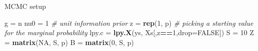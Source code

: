 \documentclass[ignorenonframetext,]{beamer}
\newenvironment{Shaded}{\begin{snugshade}}{\end{snugshade}}
\newcommand{\KeywordTok}[1]{\textcolor[rgb]{0.13,0.29,0.53}{\textbf{#1}}}
\newcommand{\DataTypeTok}[1]{\textcolor[rgb]{0.13,0.29,0.53}{#1}}
\newcommand{\DecValTok}[1]{\textcolor[rgb]{0.00,0.00,0.81}{#1}}
\newcommand{\StringTok}[1]{\textcolor[rgb]{0.31,0.60,0.02}{#1}}
\newcommand{\CommentTok}[1]{\textcolor[rgb]{0.56,0.35,0.01}{\textit{#1}}}
\newcommand{\OtherTok}[1]{\textcolor[rgb]{0.56,0.35,0.01}{#1}}
\newcommand{\OperatorTok}[1]{\textcolor[rgb]{0.81,0.36,0.00}{\textbf{#1}}}
\newcommand{\NormalTok}[1]{#1}
\begin{document}
\begin{frame}[fragile]{MCMC setup}

\begin{Shaded}
\begin{Highlighting}[]
\NormalTok{g =}\StringTok{ }\NormalTok{n}
\NormalTok{nu0 =}\StringTok{ }\DecValTok{1} \CommentTok{# unit information prior}
\NormalTok{z =}\StringTok{ }\KeywordTok{rep}\NormalTok{(}\DecValTok{1}\NormalTok{, p)}
\CommentTok{# picking a starting value for the marginal probability}
\NormalTok{lpy.c =}\StringTok{ }\KeywordTok{lpy.X}\NormalTok{(ys, Xs[,z}\OperatorTok{==}\DecValTok{1}\NormalTok{,}\DataTypeTok{drop=}\OtherTok{FALSE}\NormalTok{])}
\NormalTok{S =}\StringTok{ }\DecValTok{10}
\NormalTok{Z =}\StringTok{ }\KeywordTok{matrix}\NormalTok{(}\OtherTok{NA}\NormalTok{, S, p)}
\NormalTok{B =}\StringTok{ }\KeywordTok{matrix}\NormalTok{(}\DecValTok{0}\NormalTok{, S, p)}
\end{Highlighting}
\end{Shaded}

\end{frame}
\end{document}
